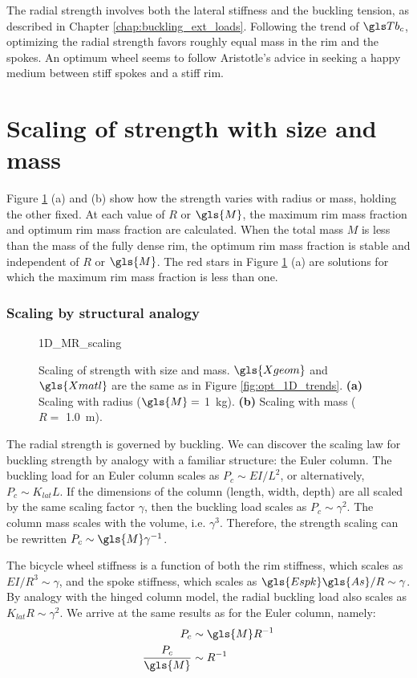 \documentclass[\rootdir/thesis.tex]{subfiles}
\begin{document}
The radial strength involves both the lateral stiffness and the buckling tension, as described in Chapter \ref{chap:buckling_ext_loads}. Following the trend of $\Tb_c$, optimizing the radial strength favors roughly equal mass in the rim and the spokes. An optimum wheel seems to follow Aristotle's advice in seeking a happy medium between stiff spokes and a stiff rim.

\section{Scaling of strength with size and mass}

Figure \ref{fig:opt_1D_scaling} (a) and (b) show how the strength varies with radius or mass, holding the other fixed. At each value of $R$ or $\gls{M}$, the maximum rim mass fraction and optimum rim mass fraction are calculated. When the total mass $M$ is less than the mass of the fully dense rim, the optimum rim mass fraction is stable and independent of $R$ or $\gls{M}$. The red stars in Figure \ref{fig:opt_1D_scaling} (a) are solutions for which the maximum rim mass fraction is less than one.

\subsubsection*{Scaling by structural analogy}

\begin{figure}
\centering
{1D_MR_scaling}
\caption{Scaling of strength with size and mass. $\gls{Xgeom}$ and $\gls{Xmatl}$ are the same as in Figure \ref{fig:opt_1D_trends}. \textbf{(a)} Scaling with radius ($\gls{M}=$ \SI{1}{kg}). \textbf{(b)} Scaling with mass ($R=$ \SI{1.0}{m}).}
\label{fig:opt_1D_scaling}
\end{figure}

The radial strength is governed by buckling. We can discover the scaling law for buckling strength by analogy with a familiar structure: the Euler column. The buckling load for an Euler column scales as $P_c \sim EI/L^2$, or alternatively, $P_c \sim K_{lat}L$. If the dimensions of the column (length, width, depth) are all scaled by the same scaling factor $\gamma$, then the buckling load scales as $P_c \sim \gamma^2$. The column mass scales with the volume, i.e. $\gamma^3$. Therefore, the strength scaling can be rewritten $P_c \sim \gls{M} \gamma^{-1}$.

The bicycle wheel stiffness is a function of both the rim stiffness, which scales as $EI/R^3 \sim \gamma$, and the spoke stiffness, which scales as $\gls{Espk}\gls{As}/R \sim \gamma$. By analogy with the hinged column model, the radial buckling load also scales as $K_{lat}R \sim \gamma^2$. We arrive at the same results as for the Euler column, namely:
\begin{subequations}
\label{eqn:opt_scaling}
\begin{align}
P_c           &\sim \gls{M} R^{-1}\\
\frac{P_c}{\gls{M}} &\sim R^{-1}
\end{align}
\end{subequations}
\end{document}
